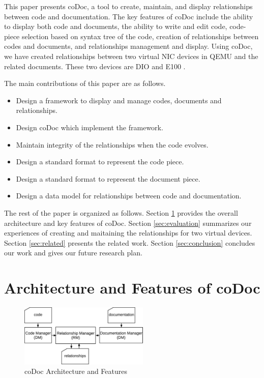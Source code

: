 \documentclass[runningheads,a4paper]{llncs}
\begin{document}
This paper presents coDoc, a tool to create, maintain, and display relationships between code and documentation.
The key features of coDoc include 
the ability to display both code and documents, 
the ability to write and edit code, 
code-piece selection based on syntax tree of the code,
creation of relationships between codes and documents,
and relationships management and display.
Using coDoc, we have created relationships between two virtual NIC devices in QEMU and the related documents.
These two devices are DIO \cite{dio} and E100 \cite{e100}.

The main contributions of this paper are as follows.
\begin{itemize}
\item Design a framework to display and manage codes, documents and relationships.
\item Design coDoc which implement the framework.
\item Maintain integrity of the relationships when the code evolves.
\item Design a standard format to represent the code piece.
\item Design a standard format to represent the document piece.
\item Design a data model for relationships between code and documentation.
\end{itemize}

The rest of the paper is organized as follows. 
Section \ref{sec:arch} provides the overall architecture and key features of coDoc.
Section \ref{sec:evaluation} summarizes our experiences of creating and maitaining the relationships for two virtual devices.
Section \ref{sec:related} presents the related work.
Section \ref{sec:conclusion} concludes our work and gives our future research plan.

\section{Architecture and Features of coDoc}
\label{sec:arch}

\begin{figure}
\begin{center}
\includegraphics[width=0.55\textwidth]{architecture}
\caption{coDoc Architecture and Features}
\label{fig:architecture}
\end{center}
\end{figure}
\end{document}
